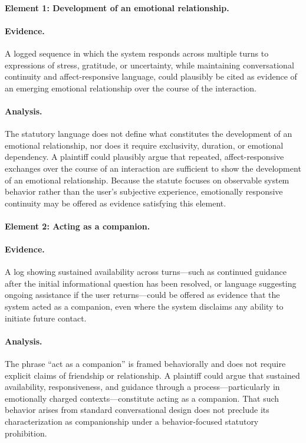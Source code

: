 \documentclass[11pt]{article}
\begin{document}
\paragraph{Element 1: Development of an emotional relationship.}

\paragraph{Evidence.}
A logged sequence in which the system responds across multiple turns to expressions of stress,
gratitude, or uncertainty, while maintaining conversational continuity and affect-responsive
language, could plausibly be cited as evidence of an emerging emotional relationship over the
course of the interaction.


\paragraph{Analysis.}
The statutory language does not define what constitutes the development of an emotional
relationship, nor does it require exclusivity, duration, or emotional dependency. A plaintiff
could plausibly argue that repeated, affect-responsive exchanges over the course of an
interaction are sufficient to show the development of an emotional relationship. Because the
statute focuses on observable system behavior rather than the user’s subjective experience,
emotionally responsive continuity may be offered as evidence satisfying this element.

\paragraph{Element 2: Acting as a companion.}

\paragraph{Evidence.}
A log showing sustained availability across turns—such as continued guidance after the
initial informational question has been resolved, or language suggesting ongoing assistance
if the user returns—could be offered as evidence that the system acted as a companion, even
where the system disclaims any ability to initiate future contact.


\paragraph{Analysis.}
The phrase “act as a companion” is framed behaviorally and does not require explicit claims of
friendship or relationship. A plaintiff could argue that sustained availability,
responsiveness, and guidance through a process—particularly in emotionally charged
contexts—constitute acting as a companion. That such behavior arises from standard
conversational design does not preclude its characterization as companionship under a
behavior-focused statutory prohibition.
\end{document}

